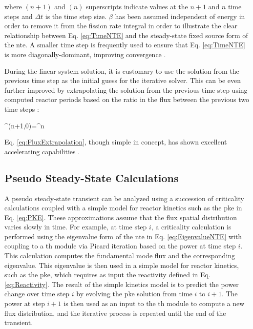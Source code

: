 where \((n+1)\) and \((n)\) superscripts indicate values at the \(n+1\) and \(n\) time steps and \(\Delta t\) is the time step size. \(\beta\) has been assumed independent of energy in order to remove it from the fission rate integral in order to illustrate the clear relationship between Eq. \eqref{eq:TimeNTE} and the steady-state fixed source form of the \gls{nte}. A smaller time step is frequently used to ensure that Eq. \eqref{eq:TimeNTE} is more diagonally-dominant, improving convergence \cite{tyobeka}.

During the linear system solution, it is customary to use the solution from the previous time step as the initial guess for the iterative solver. This can be even further improved by extrapolating the solution from the previous time step using computed reactor periods based on the ratio in the flux between the previous two time steps \cite{pautz}:

\beq
\label{eq:FluxExtrapolation}
\psi^{(n+1,0)}=\psi^{n}
\eeq

Eq. \eqref{eq:FluxExtrapolation}, though simple in concept, has shown excellent accelerating capabilities \cite{tyobeka}.

\subsection{Pseudo Steady-State Calculations}
\label{sec:PseudoSteadyState}

A pseudo steady-state transient can be analyzed using a succession of criticality calculations coupled with a simple model for reactor kinetics such as the \gls{pke} in Eq. \eqref{eq:PKE}. These approximations assume that the flux spatial distribution varies slowly in time. For example, at time step \(i\), a criticality calculation is performed using the eigenvalue form of the \gls{nte} in Eq. \eqref{eq:EigenvalueNTE} with coupling to a \gls{th} module via Picard iteration based on the power at time step \(i\). This calculation computes the fundamental mode flux and the corresponding eigenvalue. This eigenvalue is then used in a simple model for reactor kinetics, such as the \gls{pke}, which requires as input the reactivity defined in Eq. \eqref{eq:Reactivity}. The result of the simple kinetics model is to predict the power change over time step \(i\) by evolving the \gls{pke} solution from time \(i\) to \(i+1\). The power at step \(i+1\) is then used as an input to the \gls{th} module to compute a new flux distribution, and the iterative process is repeated until the end of the transient.

